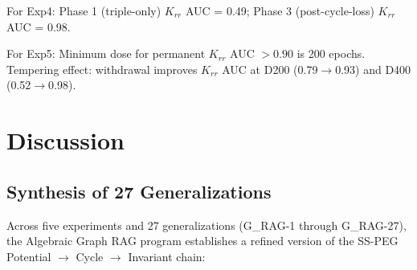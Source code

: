 \documentclass[11pt,letterpaper]{article}
\begin{document}
\begin{table}[H]
\centering
\caption{Consolidated results matrix across all five experiments}
\end{table}

For Exp4: Phase 1 (triple-only) $K_{rr}$ AUC = 0.49; Phase 3 (post-cycle-loss) $K_{rr}$ AUC = 0.98.

For Exp5: Minimum dose for permanent $K_{rr}$ AUC $> 0.90$ is 200 epochs. Tempering effect: withdrawal improves $K_{rr}$ AUC at D200 (0.79$\to$0.93) and D400 (0.52$\to$0.98).

\section{Discussion}

\subsection{Synthesis of 27 Generalizations}

Across five experiments and 27 generalizations (G\_RAG-1 through G\_RAG-27), the Algebraic Graph RAG program establishes a refined version of the SS-PEG Potential $\to$ Cycle $\to$ Invariant chain:
\end{document}
